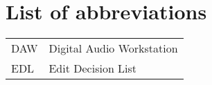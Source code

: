 \chapter*{List of abbreviations}

\begin{tabular}{l l}
DAW & Digital Audio Workstation \\
EDL & Edit Decision List
\end{tabular}
